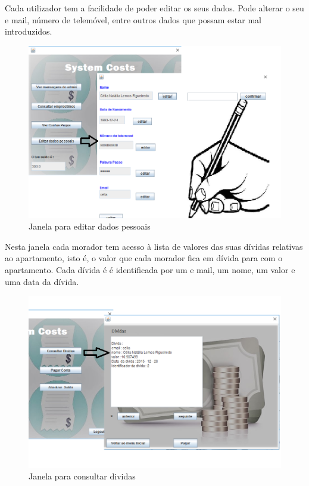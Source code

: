  \newpage \clearpage

Cada utilizador tem a facilidade de poder editar os seus dados. Pode alterar o seu e mail, número de telemóvel, entre outros dados que possam estar mal introduzidos. 


\begin{figure}[h!]
	\centering
	\includegraphics[scale=0.55]{imagens/interface/editardadosmorador}  
	\caption{Janela para editar dados pessoais}  
\end{figure}


Nesta janela cada morador tem acesso à lista de valores das suas dívidas relativas ao apartamento, isto é, o valor que cada morador fica em dívida para com o apartamento. Cada dívida é é identificada por um e mail, um nome, um valor e uma data da dívida.

\begin{figure}[h!]
	\centering
	\includegraphics[scale=0.55]{imagens/interface/consultardividasmorador}  
	\caption{Janela para consultar dividas}  
\end{figure}

